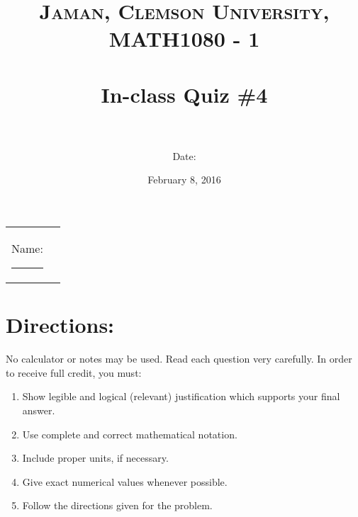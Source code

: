 \documentclass[paper=a4, fontsize=11pt]{scrartcl} %
\title{	
\normalfont \normalsize 
\textsc{Jaman, Clemson University, MATH1080 - 1} \\ [25pt] %
\horrule{0.5pt} \\[0.4cm] %
\huge In-class Quiz \#4 \\ %
\horrule{2pt} \\[0.5cm] %
}
\author{Date:} %
\date{\normalsize February 8, 2016} %
\numberwithin{equation}{section} %
\numberwithin{figure}{section} %
\numberwithin{table}{section} %
\begin{document}
\maketitle %

\begin{flushleft}
\begin{tabular}{l l}
Name: \rule{3.2in}{.01cm}  & {}%
\end{tabular}
\end{flushleft}


\section*{\textbf{Directions:}}

No calculator or notes may be used.  Read each question very carefully.  In order to receive full credit, you must:
\begin{enumerate}
\item Show legible and logical (relevant) justification which supports your final answer.
\item Use complete and correct mathematical notation.
\item Include proper units, if necessary.
\item Give exact numerical values whenever possible.
\item Follow the directions given for the problem.
\end{enumerate}
\vspace{.1in}

\newpage
\end{document}
